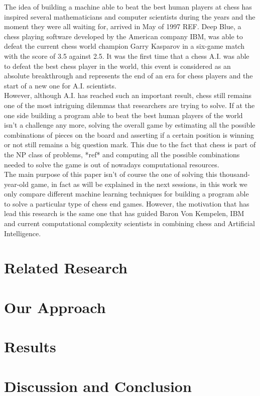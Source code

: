 \documentclass{article}
\begin{document}
The idea of building a machine able to beat the best human players at chess has inspired several mathematicians and computer scientists during the years and the moment they were all waiting for, arrived in May of 1997 REF. Deep Blue, a chess playing software developed by the American company IBM, was able to defeat the current chess world champion Garry Kasparov in a six-game match with the score of 3.5 against 2.5. It was the first time that a chess A.I. was able to defeat the best chess player in the world, this event is considered as an absolute breakthrough and represents the end of an era for chess players and the start of a new one for A.I. scientists.\\
However, although A.I. has reached such an important result, chess still remains one of the most intriguing dilemmas that researchers are trying to solve. If at the one side building a program able to beat the best human players of the world isn't a challenge any more, solving the overall game by estimating all the possible combinations of pieces on the board and asserting if a certain position is winning or not still remains a big question mark. This due to the fact that chess is part of the NP class of problems, *ref* and computing all the possible combinations needed to solve the game is out of nowadays computational resources.\\
The main purpose of this paper isn't of course the one of solving this thousand-year-old game, in fact as will be explained in the next sessions, in this work we only compare different machine learning techniques for building a program able to solve a particular type of chess end games. However, the motivation that has lead this research is the same one that has guided Baron Von Kempelen, IBM and current computational complexity scientists in combining chess and Artificial Intelligence.            





            


\section{Related Research}


\section{Our Approach}


\section{Results}


\section{Discussion and Conclusion}





\end{document}
